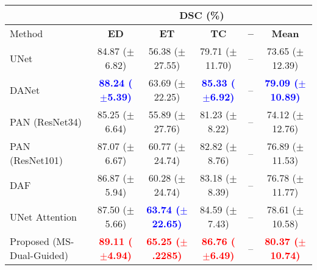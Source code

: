 \documentclass[journal]{IEEEtran}
\begin{document}
\begin{table*}[t!]
\centering
\scriptsize
\begin{tabular}{lcccc|c}\\
\toprule
 & \multicolumn{5}{c}{\textbf{DSC} (\%)}\\
 \midrule
Method & \textbf{ED} & \textbf{ET} & \textbf{TC} & \textbf{--} & \textbf{Mean}  \\
 \midrule
UNet \cite{ronneberger2015u}  & 84.87 ($\pm$6.82)  & 56.38 ($\pm$27.55) & 79.71 ($\pm$11.70) & -- &  73.65 ($\pm$12.39) \\
DANet \cite{fu2018dual}  & \textcolor{blue}{\textbf{88.24  ($\pm$5.39)}} & 63.69 ($\pm$22.25)& \textcolor{blue}{\textbf{85.33 ($\pm$6.92)}} & --&  \textcolor{blue}{\textbf{79.09 ($\pm$10.89)}}   \\
PAN (ResNet34) \cite{li2018pyramid}   & 85.25 ($\pm$6.64)  & 55.89 ($\pm$27.76) & 81.23  ($\pm$8.22) & -- & 74.12 ($\pm$12.76) \\
PAN (ResNet101)\cite{li2018pyramid}   & 87.07 ($\pm$6.67)  & 60.77 ($\pm$24.74) & 82.82 ($\pm$8.76) & -- & 76.89 ($\pm$11.53) \\
DAF \cite{wang18d}  &  86.87 ($\pm$5.94) & 60.28 ($\pm$24.74)& 83.18 ($\pm$8.39) &  -- &  76.78 ($\pm$11.77)   \\
UNet Attention \cite{schlemper2019attention}  &   87.50 ($\pm$5.66) & \textcolor{blue}{\textbf{63.74 ($\pm$22.65)}}&  84.59 ($\pm$7.43) & -- &  78.61 ($\pm$10.58)   \\
Proposed (MS-Dual-Guided)  & \textcolor{red}{\textbf{89.11 ($\pm$4.94)}}  & \textcolor{red}{\textbf{65.25 ($\pm$.2285)}}& \textcolor{red}{\textbf{86.76 ($\pm$6.49)}}  & -- &  \textcolor{red}{\textbf{80.37 ($\pm$10.74)}} \\


\end{tabular}
\end{table*}
\end{document}
